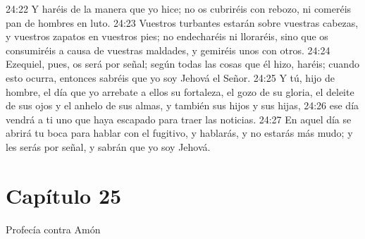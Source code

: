 24:22 Y haréis de la manera que yo hice; no os cubriréis con rebozo, ni comeréis pan de hombres en luto.   
24:23 Vuestros turbantes estarán sobre vuestras cabezas, y vuestros zapatos en vuestros pies; no endecharéis ni lloraréis, sino que os consumiréis a causa de vuestras maldades, y gemiréis unos con otros.   
24:24 Ezequiel, pues, os será por señal; según todas las cosas que él hizo, haréis; cuando esto ocurra, entonces sabréis que yo soy Jehová el Señor.   
24:25 Y tú, hijo de hombre, el día que yo arrebate a ellos su fortaleza, el gozo de su gloria, el deleite de sus ojos y el anhelo de sus almas, y también sus hijos y sus hijas,   
24:26 ese día vendrá a ti uno que haya escapado para traer las noticias.   
24:27 En aquel día se abrirá tu boca para hablar con el fugitivo, y hablarás, y no estarás más mudo; y les serás por señal, y sabrán que yo soy Jehová.   
\section*{Capítulo 25  }
Profecía contra Amón   
  
